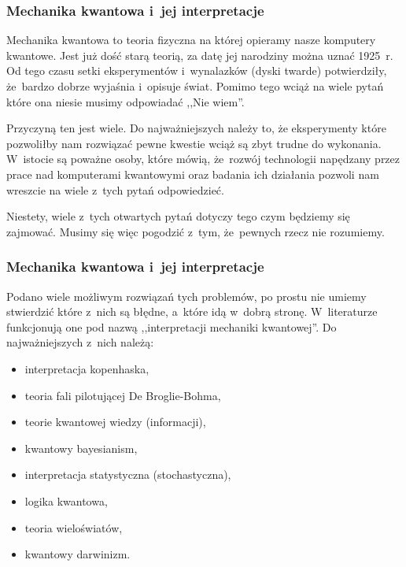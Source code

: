 \documentclass[10pt,t]{beamer}
\begin{document}
\begin{frame}
  \frametitle{Mechanika kwantowa i~jej interpretacje}


  Mechanika kwantowa to teoria fizyczna na której opieramy nasze komputery kwantowe. Jest już dość starą teorią, za datę jej narodziny można uznać
  1925~r. Od tego czasu setki eksperymentów i~wynalazków (dyski
  twarde) potwierdziły, że~bardzo dobrze wyjaśnia i~opisuje świat.
  Pomimo tego wciąż na wiele pytań które ona niesie musimy
  odpowiadać ,,Nie wiem''.

  Przyczyną ten jest wiele. Do najważniejszych należy to, że
  eksperymenty które pozwoliłby nam rozwiązać pewne kwestie wciąż są
  zbyt trudne do wykonania. W~istocie są poważne osoby, które mówią,
  że~rozwój technologii napędzany przez prace nad komputerami
  kwantowymi oraz badania ich działania pozwoli nam wreszcie
  na wiele z~tych pytań odpowiedzieć.

  Niestety, wiele z~tych otwartych pytań dotyczy tego czym będziemy się zajmować. Musimy się więc pogodzić z~tym, że~pewnych rzecz nie rozumiemy.

\end{frame}




\begin{frame}
  \frametitle{Mechanika kwantowa i~jej interpretacje}


  Podano wiele możliwym rozwiązań tych problemów, po prostu nie umiemy stwierdzić które z~nich są błędne, a~które idą w~dobrą stronę. W~literaturze funkcjonują one pod nazwą ,,interpretacji mechaniki kwantowej''. Do najważniejszych z~nich należą:
  \begin{itemize}
  \item interpretacja kopenhaska,

    \item teoria fali pilotującej De Broglie-Bohma,

  \item teorie kwantowej wiedzy (informacji),

  \item kwantowy bayesianism,

  \item interpretacja statystyczna (stochastyczna),

  \item logika kwantowa,

  \item teoria wieloświatów,

  \item kwantowy darwinizm.

  \end{itemize}

\end{frame}
\end{document}
